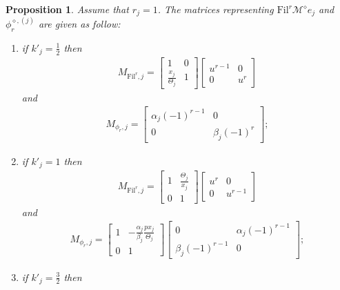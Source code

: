 \documentclass[11pt]{amsart}
\theoremstyle{definition}
\numberwithin{equation}{subsection}
\theoremstyle{plain}
\theoremstyle{plain}
\theoremstyle{plain}
\theoremstyle{plain}
\theoremstyle{plain}
\theoremstyle{plain}
\theoremstyle{plain}
\theoremstyle{plain}
\newtheorem{prop}[equation]{Proposition}
\theoremstyle{plain}
\theoremstyle{plain}
\theoremstyle{plain}
\theoremstyle{plain}
\theoremstyle{definition}
\theoremstyle{definition}
\theoremstyle{definition}
\theoremstyle{remark}
\renewcommand{\(}{\textup{(}}
\renewcommand{\)}{\textup{)}}
\newcommand{\cM}{\mathcal{M}}
\newcommand{\Fil}{\mathrm{Fil}}
\begin{document}
\begin{prop}\label{prop: mod p reduction, r_j=1}
Assume that $r_j=1$. The matrices representing $\Fil^r\cM^\diamond e_j$ and $\phi_r^{\diamond,(j)}$ are given as follow:
\begin{enumerate}[leftmargin=*]
\item if $k'_j=\frac{1}{2}$ then
    \begin{align*}
    M_{\Fil^r,j}
        =
        \begin{bmatrix}
          1 & 0 \\
          \frac{x_j}{\Theta_j} & 1
        \end{bmatrix}
        \begin{bmatrix}
            u^{r-1} & 0 \\
            0 & u^r
        \end{bmatrix}
    \end{align*}
    and
    \begin{align*}
    M_{\phi_r,j}
        =
        \begin{bmatrix}
            \alpha_j (-1)^{r-1} & 0 \\
            0 & \beta_j (-1)^r
        \end{bmatrix};
    \end{align*}
\item if $k'_j=1$ then
    \begin{align*}
    M_{\Fil^r,j}
        =
        \begin{bmatrix}
          1 & \frac{\Theta_j}{x_j} \\
          0 & 1
        \end{bmatrix}
        \begin{bmatrix}
            u^r & 0 \\
            0 & u^{r-1}
        \end{bmatrix}
    \end{align*}
    and
    \begin{align*}
    M_{\phi_r,j}
        =
        \begin{bmatrix}
          1 & -\frac{\alpha_j}{\beta_j}\frac{px_j}{\Theta_j} \\
          0 & 1
        \end{bmatrix}
        \begin{bmatrix}
            0 & \alpha_j (-1)^{r-1} \\
            \beta_j (-1)^{r-1} & 0
        \end{bmatrix};
    \end{align*}
\item if $k'_j=\frac{3}{2}$ then

\end{enumerate}
\end{prop}
\end{document}
